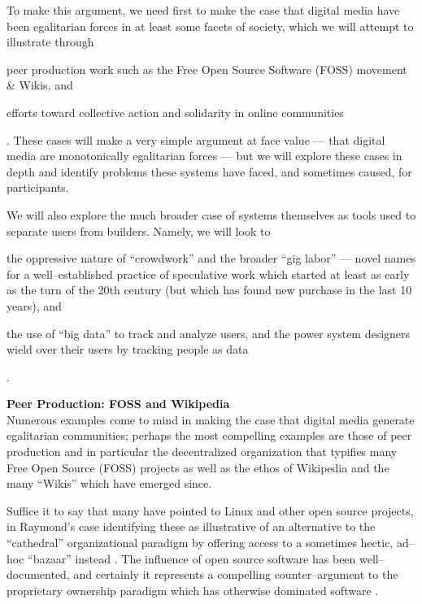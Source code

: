 \documentclass[11pt,titlepage]{article}
\newcommand{\sectitle}[1]{\textbf{#1}\\}
\begin{document}
To make this argument,
we need first to make the case that
digital media have been egalitarian forces in at least some facets of society,
which we will attempt to illustrate through
\begin{inlinelist}
  \item peer production work
      such as the Free Open Source Software (FOSS) movement \& Wikis, and
  \item efforts toward collective action and solidarity in online communities
\end{inlinelist}.
These cases will make a very simple argument at face value
--- that digital media are monotonically egalitarian forces ---
but we will explore these cases in depth and identify problems these systems have faced,
and sometimes caused, for participants.


We will also explore the much broader case of
systems themselves as tools used to separate users from builders.
Namely, we will look to
\begin{inlinelist}
  \item the oppressive nature of ``crowdwork'' and the broader ``gig labor''
  --- novel names for a well--established practice of
  speculative work which started at least as early as the turn of the 20th century
  (but which has found new purchase in the last 10 years), and
  \item the use of ``big data'' to track and analyze users, and
  the power system designers wield over their users by tracking people as data
\end{inlinelist}.





\sectitle{Peer Production: FOSS and Wikipedia}
Numerous examples come to mind in making the case that
digital media generate egalitarian communities;
perhaps the most compelling examples are those of peer production and
in particular
the decentralized organization that typifies many Free Open Source (FOSS) projects
as well as the ethos of Wikipedia and the many ``Wikis'' which have emerged since.

Suffice it to say that many have pointed to Linux and other open source projects,
in Raymond's case
identifying these as illustrative of an alternative to the ``cathedral'' organizational paradigm by
offering access to a sometimes hectic, ad--hoc ``bazaar'' instead
\cite{raymond1999cathedral,weber2004success,crowston2006core}.
The influence of open source software has been well--documented,
and certainly it represents a compelling counter--argument to
the proprietary ownership paradigm which has otherwise dominated software
\cite{kelty2008two,weber2004success}.
\end{document}
